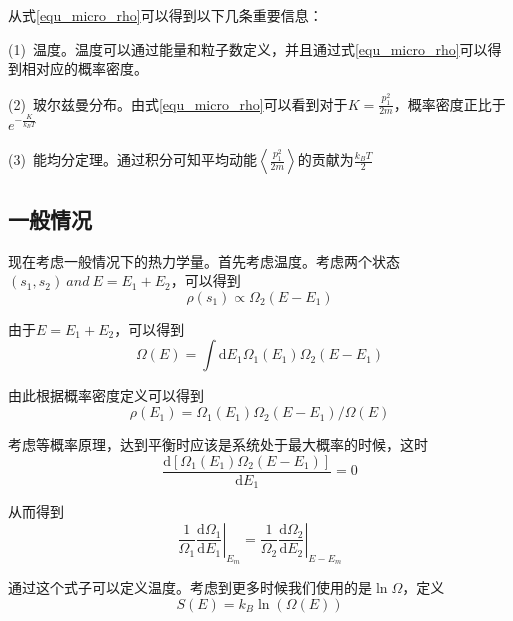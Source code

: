 \documentclass[UTF8]{ctexart}
\begin{document}
	从式\ref{equ_micro_rho}可以得到以下几条重要信息：
	
	
	(1)\ 温度。温度可以通过能量和粒子数定义，并且通过式\ref{equ_micro_rho}可以得到相对应的概率密度。
	
	
	(2)\ 玻尔兹曼分布。由式\ref{equ_micro_rho}可以看到对于$ K=\frac{p_{1}^{2}}{2 m} $，概率密度正比于$ e^{-\frac{K}{k_{B}T}} $
	
	
	(3)\ 能均分定理。通过积分可知平均动能$ \left\langle \frac{p_{1}^{2}}{2 m}\right \rangle $的贡献为$ \frac{k_{B} T}{2} $
	
	\subsection{一般情况}
	现在考虑一般情况下的热力学量。首先考虑温度。考虑两个状态$ (s_{1},s_{2})\ and\ E=E_{1}+E_{2} $，可以得到
	\begin{equation}
		\rho\left(s_{1}\right) \propto \Omega_{2}\left(E-E_{1}\right)
	\end{equation}
	
\noindent 由于$ E=E_{1}+E_{2} $，可以得到
\begin{equation}
\Omega(E)=\int \mathrm{d} E_{1} \Omega_{1}\left(E_{1}\right) \Omega_{2}\left(E-E_{1}\right)
\end{equation}

\noindent 由此根据概率密度定义可以得到
\begin{equation}
\rho\left(E_{1}\right)=\Omega_{1}\left(E_{1}\right) \Omega_{2}\left(E-E_{1}\right) / \Omega(E)
\end{equation}

\noindent 考虑等概率原理，达到平衡时应该是系统处于最大概率的时候，这时
\begin{equation}
	\frac{\mathrm{d} \left[\Omega_{1}\left(E_{1}\right) \Omega_{2}\left(E-E_{1}\right)\right]}{\mathrm{d} E_{1}}=0
\end{equation}

\noindent 从而得到
\begin{equation}
\frac{1}{\Omega_{1}}\left.\frac{\mathrm{d} \Omega_{1}}{\mathrm{d} E_{1}}\right|_{E_{m}}=\frac{1}{\Omega_{2}}\left.\frac{\mathrm{d} \Omega_{2}}{\mathrm{d} E_{2}}\right|_{E-E_{m}}\label{equ_micro_Omega}
\end{equation}

	通过这个式子可以定义温度。考虑到更多时候我们使用的是$ \ln \Omega $，定义
	\begin{equation}
		S(E)=k_{B} \ln \left(\Omega(E)\right)\label{equ_micro_S}
	\end{equation}
	
\end{document}
